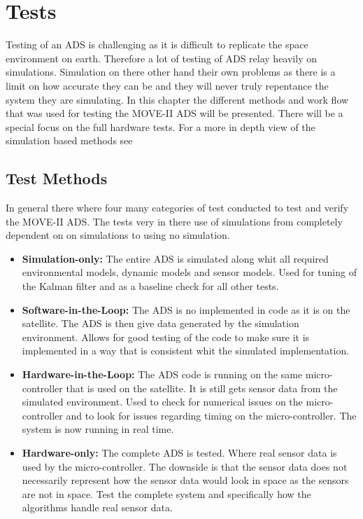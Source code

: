 \chapter{Tests}\label{chap:tests}
Testing of an ADS is challenging as it is difficult to replicate the space environment on earth. Therefore a lot of testing of ADS relay heavily on simulations. Simulation on there other hand their own problems as there is a limit on how accurate they can be and they will never truly repentance the system they are simulating. In this chapter the different methods and work flow that was used for testing the MOVE-II ADS will be presented. There will be a special focus on the full hardware tests. For a more in depth view of the simulation based methods see \cite{DavidThesis}           

\section{Test Methods}
In general there where four many categories of test conducted to test and verify the MOVE-II ADS. The tests very in there use of simulations from completely dependent on on simulations to using no simulation. 

\begin{itemize}
  \item \textbf{Simulation-only:} The entire ADS is simulated along whit all required environmental models, dynamic models and sensor models. Used for tuning of the Kalman filter and as a baseline check for all other tests.   
  \item \textbf{Software-in-the-Loop:} The ADS is no implemented in code as it is on the satellite. The ADS is then give data generated by the simulation environment. Allows for good testing of the code to make sure it is implemented in a way that is consistent whit the simulated implementation.    
  \item \textbf{Hardware-in-the-Loop:} The ADS code is running on the same micro-controller that is used on the satellite. It is still gets sensor data from the simulated environment. Used to check for numerical issues on the micro-controller and to look for issues regarding timing on the micro-controller. The system is now running in real time.    
  \item \textbf{Hardware-only:} The complete ADS is tested. Where real sensor data is used by the micro-controller. The downside is that the sensor data does not necessarily represent how the sensor data would look in space as the sensors are not in space. Test the complete system and specifically how the algorithms handle real sensor data.        
\end{itemize}  

